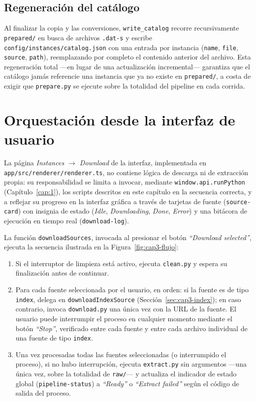 \subsection{Regeneraci\'on del cat\'alogo}

Al finalizar la copia y las conversiones, \texttt{write\_catalog} recorre
recursivamente \texttt{prepared/} en busca de archivos \texttt{.dat-s} y
escribe \texttt{config/instances/catalog.json} con una entrada por
instancia (\texttt{name}, \texttt{file}, \texttt{source}, \texttt{path}),
reemplazando por completo el contenido anterior del archivo. Esta
regeneraci\'on total —en lugar de una actualizaci\'on incremental— garantiza
que el cat\'alogo jam\'as referencie una instancia que ya no existe en
\texttt{prepared/}, a costa de exigir que \texttt{prepare.py} se ejecute
sobre la totalidad del pipeline en cada corrida.

\section{Orquestaci\'on desde la interfaz de usuario}
\label{sec:cap3-ui}

La p\'agina \emph{Instances $\to$ Download} de la interfaz, implementada en
\texttt{app/src/renderer/renderer.ts}, no contiene l\'ogica de descarga ni
de extracci\'on propia: su responsabilidad se limita a invocar, mediante
\texttt{window.api.runPython} (Cap\'itulo~\ref{cap:1}), los scripts descritos
en este cap\'itulo en la secuencia correcta, y a reflejar su progreso en la
interfaz gr\'afica a trav\'es de tarjetas de fuente
(\texttt{source-card}) con insignia de estado (\emph{Idle},
\emph{Downloading}, \emph{Done}, \emph{Error}) y una bit\'acora de ejecuci\'on
en tiempo real (\texttt{download-log}).

La funci\'on \texttt{downloadSources}, invocada al presionar el bot\'on
\emph{``Download selected''}, ejecuta la secuencia ilustrada en la
Figura~\ref{fig:cap3-flujo}:

\begin{enumerate}
    \item Si el interruptor de limpieza est\'a activo, ejecuta
    \texttt{clean.py} y espera su finalizaci\'on antes de continuar.
    \item Para cada fuente seleccionada por el usuario, en orden: si la
    fuente es de tipo \texttt{index}, delega en
    \texttt{downloadIndexSource} (Secci\'on~\ref{sec:cap3-index}); en caso
    contrario, invoca \texttt{download.py} una \'unica vez con la URL de la
    fuente. El usuario puede interrumpir el proceso en cualquier momento
    mediante el bot\'on \emph{``Stop''}, verificado entre cada fuente y entre
    cada archivo individual de una fuente de tipo \texttt{index}.
    \item Una vez procesadas todas las fuentes seleccionadas (o
    interrumpido el proceso), si no hubo interrupci\'on, ejecuta
    \texttt{extract.py} sin argumentos —una \'unica vez, sobre la totalidad
    de \texttt{raw/}— y actualiza el indicador de estado global
    (\texttt{pipeline-status}) a \emph{``Ready''} o \emph{``Extract
    failed''} seg\'un el c\'odigo de salida del proceso.
\end{enumerate}

